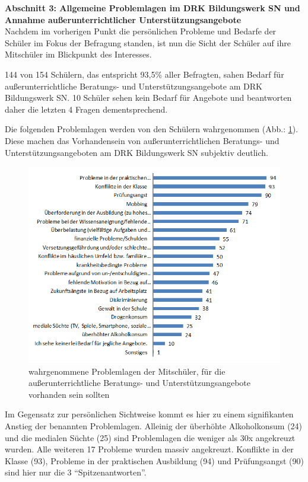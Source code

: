 \noindent
\textbf{Abschnitt 3: Allgemeine Problemlagen im DRK Bildungswerk SN und Annahme außerunterrichtlicher Unterstützungsangebote}\\

\noindent
Nachdem im vorherigen Punkt die persönlichen Probleme und Bedarfe der Schüler im Fokus der Befragung standen, ist nun die Sicht der Schüler auf ihre Mitschüler im Blickpunkt des Interesses.

144 von 154 Schülern, das entspricht 93,5\% aller Befragten, sahen Bedarf für außerunterrichtliche Beratungs- und Unterstützungsangebote am DRK Bildungswerk SN. 10 Schüler sehen kein Bedarf für Angebote und beantworten daher die letzten 4 Fragen dementsprechend.

Die folgenden Problemlagen werden von den Schülern wahrgenommen (Abb.: \ref{fig:Problemlagen-der-Mitschueler}). Diese machen das Vorhandensein von außerunterrichtlichen Beratungs- und Unterstützungsangeboten am DRK Bildungswerk SN subjektiv deutlich.

\begin{figure}[ht]
	\centering
		\includegraphics[width=1.0\textwidth]{images/Problemlagen-der-Mitschueler.png}
	\caption{wahrgenommene Problemlagen der Mitschüler, für die außerunterrichtliche Beratungs- und Unterstützungsangebote vorhanden sein sollten}
	\label{fig:Problemlagen-der-Mitschueler}
\end{figure}

\noindent
Im Gegensatz zur persönlichen Sichtweise kommt es hier zu einem signifikanten Anstieg der benannten Problemlagen. Alleinig der überhöhte Alkoholkonsum (24) und die medialen Süchte (25) sind Problemlagen die weniger als 30x angekreuzt wurden. Alle weiteren 17 Probleme wurden massiv angekreuzt. Konflikte in der Klasse (93), Probleme in der praktischen Ausbildung (94) und Prüfungsangst (90) sind hier nur die 3 "`Spitzenantworten"'.

